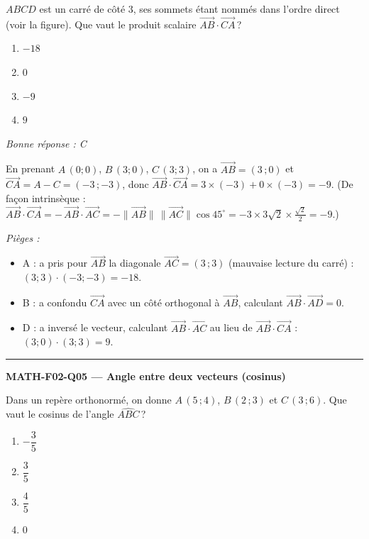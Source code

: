 \documentclass[11pt,a4paper]{article}
\newcommand{\vv}[1]{\vec{#1}}
\begin{document}
$ABCD$ est un carré de côté $3$, ses sommets étant nommés dans l'ordre direct (voir la figure). Que vaut le produit scalaire $\vv{AB}\cdot\vv{CA}$\,?
\begin{center}
\end{center}
\begin{enumerate}[label=\Alph*)]
\item $-18$
\item $0$
\item $-9$
\item $9$
\end{enumerate}
\textit{Bonne réponse : C}\par
En prenant $A\,(0;0)$, $B\,(3;0)$, $C\,(3;3)$, on a $\vv{AB}=(3\,;0)$ et $\vv{CA}=A-C=(-3\,;-3)$, donc $\vv{AB}\cdot\vv{CA}=3\times(-3)+0\times(-3)=-9$. (De façon intrinsèque : $\vv{AB}\cdot\vv{CA}=-\,\vv{AB}\cdot\vv{AC}=-\|\vv{AB}\|\,\|\vv{AC}\|\cos 45^\circ=-3\times 3\sqrt2\times\tfrac{\sqrt2}{2}=-9$.)\par
\textit{Pièges :}
\begin{itemize}
\item A : a pris pour $\vv{AB}$ la diagonale $\vv{AC}=(3\,;3)$ (mauvaise lecture du carré) : $(3;3)\cdot(-3;-3)=-18$.
\item B : a confondu $\vv{CA}$ avec un côté orthogonal à $\vv{AB}$, calculant $\vv{AB}\cdot\vv{AD}=0$.
\item D : a inversé le vecteur, calculant $\vv{AB}\cdot\vv{AC}$ au lieu de $\vv{AB}\cdot\vv{CA}$ : $(3;0)\cdot(3;3)=9$.
\end{itemize}
\vspace{8pt}\hrule\vspace{8pt}
\noindent\textbf{MATH-F02-Q05 --- Angle entre deux vecteurs (cosinus)}\par
Dans un repère orthonormé, on donne $A\,(5\,;4)$, $B\,(2\,;3)$ et $C\,(3\,;6)$. Que vaut le cosinus de l'angle $\widehat{ABC}$\,?
\begin{enumerate}[label=\Alph*)]
\item $-\dfrac{3}{5}$
\item $\dfrac{3}{5}$
\item $\dfrac{4}{5}$
\item $0$
\end{enumerate}
\end{document}
